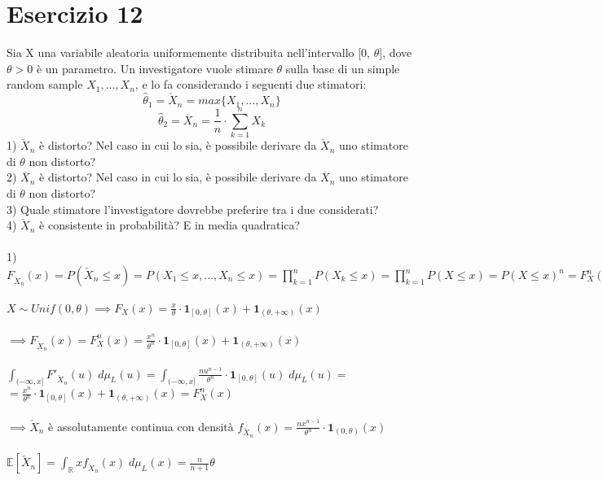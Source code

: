 \documentclass{article}
\begin{document}
\section*{Esercizio 12}
Sia X una variabile aleatoria uniformemente distribuita nell'intervallo [0, $\theta$], dove $\theta > 0$ è un parametro. Un investigatore vuole stimare $\theta$ sulla base di un simple random sample $X_{1},...,X_{n}$, e lo fa considerando i seguenti due stimatori:
\[ \hat{\theta}_{1} = \check{X}_{n} = max\{X_{1},...,X_{n}\} \]
\[ \hat{\theta}_{2} = \overline{X}_{n} = \frac{1}{n} \cdot \sum_{k=1}^{n}X_{k} \]
1) $\check{X}_{n}$ è distorto? Nel caso in cui lo sia, è possibile derivare da $\check{X}_{n}$ uno stimatore di $\theta$ non distorto?\\
2) $\overline{X}_{n}$ è distorto? Nel caso in cui lo sia, è possibile derivare da $\overline{X}_{n}$ uno stimatore di $\theta$ non distorto?\\
3) Quale stimatore l'investigatore dovrebbe preferire tra i due considerati?\\
4) $\check{X}_{n}$ è consistente in probabilità? E in media quadratica?\\
\\
1) $F_{\check{X}_{n}}(x) = P(\check{X}_{n} \leq x) = P(X_{1} \leq x,...,X_{n} \leq x) = \prod_{k=1}^{n}P(X_{k} \leq x) = \prod_{k=1}^{n}P(X \leq x) = P(X \leq x)^{n} = F_{X}^{n}(x)$\\ \\
$X \sim Unif(0, \theta) \implies F_{X}(x) = \frac{x}{\theta}\cdot \mathbf{1}_{[0,\theta]}(x) + \mathbf{1}_{(\theta, +\infty)}(x)$\\ \\
$\implies F_{\check{X}_{n}}(x) =  F_{X}^{n}(x) = \frac{x^{n}}{\theta^{n}}\cdot \mathbf{1}_{[0,\theta]}(x) + \mathbf{1}_{(\theta, +\infty)}(x)$\\ \\
$\int_{(-\infty, x]}^{}F'_{\check{X}_{n}}(u) \; d\mu_{L}(u) = \int_{(-\infty, x]}^{}\frac{nu^{n-1}}{\theta^{n}}\cdot \mathbf{1}_{[0,\theta]}(u) \; d\mu_{L}(u) =$\\
$=\frac{x^{n}}{\theta^{n}}\cdot \mathbf{1}_{[0,\theta]}(x) + \mathbf{1}_{(\theta, +\infty)}(x) =  F_{X}^{n}(x)$\\ \\
$\implies \check{X}_{n}$ è assolutamente continua con densità $f_{\check{X}_{n}}(x) = \frac{nx^{n-1}}{\theta^{n}}\cdot \mathbf{1}_{(0,\theta)}(x)$\\ \\
$\mathbb{E}[\check{X}_{n}] = \int_{\mathbb{R}}^{}xf_{\check{X}_{n}}(x) \; d\mu_{L}(x) = \frac{n}{n+1}\theta$\\ \\
\end{document}
